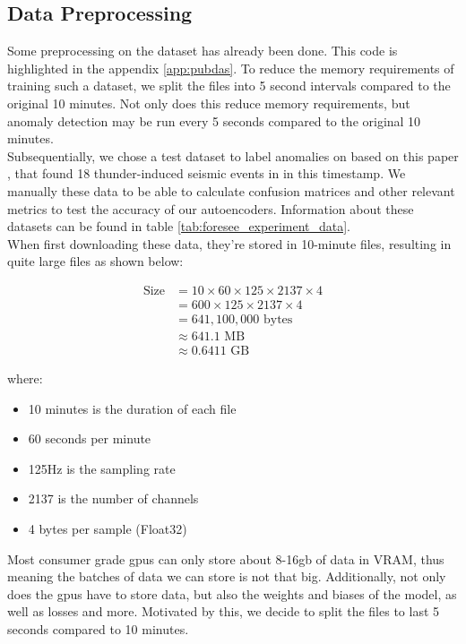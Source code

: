 \subsection{Data Preprocessing}

Some preprocessing on the dataset has already been done. This code is highlighted in the appendix \ref{app:pubdas}. To reduce the memory requirements of training such a dataset, we split the files into 5 second intervals compared to the original 10 minutes. Not only does this reduce memory requirements, but anomaly detection may be run every 5 seconds compared to the original 10 minutes. \\

Subsequentially, we chose a test dataset to label anomalies on based on this paper \cite{zhu2023seismic}, that found 18 thunder-induced seismic events in in this timestamp. We manually these data to be able to calculate confusion matrices and other relevant metrics to test the accuracy of our autoencoders. Information about these datasets can be found in table \ref{tab:foresee_experiment_data}. \\

When first downloading these data, they're stored in 10-minute files, resulting in quite large files as shown below:

\begin{align*}
\text{Size} &= 10 \times 60 \times 125 \times 2137 \times 4 \\
&= 600 \times 125 \times 2137 \times 4 \\
&= 641,100,000 \text{ bytes} \\
&\approx 641.1 \text{ MB} \\
&\approx 0.6411 \text{ GB}
\end{align*}

where:
\begin{itemize}
    \item 10 minutes is the duration of each file
    \item 60 seconds per minute
    \item 125\si{\hertz} is the sampling rate
    \item 2137 is the number of channels
    \item 4 bytes per sample (Float32)
\end{itemize}

Most consumer grade \acrshort{gpu}s can only store about 8-16gb of data in VRAM, thus meaning the batches of data we can store is not that big. Additionally, not only does the \acrshort{gpu}s have to store data, but also the weights and biases of the model, as well as losses and more. Motivated by this, we decide to split the files to last 5 seconds compared to 10 minutes. \\ 

